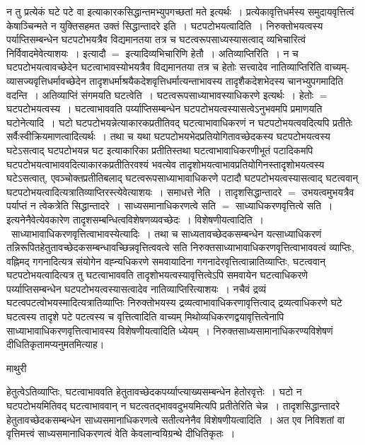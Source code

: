 \documentclass[10pt, openany]{book}
\begin{document}
{न तु प्रत्येकं घटे पटे वा इत्याकारकसिद्धान्तमभ्युपगच्छतां मते इत्यर्थः~। प्रत्येकावृत्तिधर्मस्य समुदायवृत्तित्वं केषाञ्चिन्मते न युक्तिसहमत उक्तं सिद्धान्तादरे
इति~। घटपटोभयत्वादिति~। निरुक्तोभयत्वस्य पर्याप्तिसम्बन्धेन घटपटोभयत्रैव विद्यमानतया तत्र च घटत्वरूपसाध्यस्यासत्वाद् व्यभिचारित्वं निर्विवादमेवेत्याशयः~। इत्यादौ $=$ इत्यादिव्यभिचारिणि हेतौ~। {\qt अतिव्याप्तिरिति~}। न च घटपटोभयत्वावच्छेदेन घटत्वाभावस्योभयत्रैव विद्यमानतया तत्र च हेतोः सत्त्वादेव नातिव्याप्तिरिति वाच्यम्-व्यासज्यवृत्तिधर्मावच्छेदेन तादृशधर्माश्रयैकदेशवृत्तिधर्मात्यन्ताभावस्य तादृशैकदेशभेदस्य चानभ्युपगमादिति वदन्ति~। अतिव्याप्तिं संगमयति घटत्वेति~। घटत्वरूपसाध्याभावस्याधिकरणे इत्यर्थः~। हेतोः $=$ घटपटोभयत्वस्य~। घटत्वाभाववति पर्य्याप्तिसम्बन्धेन घटपटोभयत्वस्यासत्वेऽनुभवमपि प्रमाणयति घटोनेत्यादि~। घटो घटपटोभयन्नेत्याकारकप्रतीतिवद् घटत्वाभावाधिकरणं न घटपटोभयत्ववदित्यपि प्रतीतेः सर्वैःस्वीक्रियमाणत्वादित्यर्थः~। तथा च यथा घटपटोभयभेदप्रतियोगितावच्छेदकस्य घटपटोभयत्वस्य घटेऽसत्वाद् घटपटोभयन्न घट इत्याकारिका प्रतीतिस्तथा घटत्वाभावाधिकरणीभूतं पटादिकमपि घटपटोभयत्वाभाववदित्याकारकप्रतीतिरवश्यं भवत्येव तादृशोभयत्वाभावप्रतियोगिनस्तादृशोभयत्वस्य घटेऽसत्वात्, एवञ्चोक्तप्रतीतिबलाद् घटत्वरूपसाध्याभावाधिकरणे पटादौ घटपटोभयत्वस्यासत्वाद् घटत्ववान् घटपटोभयत्वादित्यत्रातिव्याप्तिरस्त्येवेत्याशयः~। समाधत्ते {\qt नेति~}। तादृशसिद्धान्तादरे $=$ उभयत्वमुभयत्रैव पर्याप्तं न त्वेकत्रेति सिद्धान्तादरे~। साध्यसमानाधिकरणत्वे सति
 $=$ साध्याधिकरणवृत्तित्वे सति~। इत्यनेनैवेत्येवकारेण तादृशसम्बन्धित्वविशेषणव्यवच्छेदः~। {\qt विशेषणीयत्वादिति~}।~साध्याभावाधिकरणवृत्तित्वाभावस्येत्यादिः~। तथा च
साध्यतावच्छेदकसम्बन्धेन यत्साध्याधिकरणं तन्निरूपितहेतुतावच्छेदकसम्बन्धावच्छिन्नवृत्तित्ववत्वे सति निरुक्तसाध्याभावाधिकरणवृत्तित्वाभाववत्वं व्याप्तिः, वह्निमद् गगनादित्यत्र संयोगेन वह्न्यधिकरणे समवायादिना गगनादेरवृत्तित्वान्नातिव्याप्तिः, घटत्ववान् घटपटोभयत्वादित्यत्र तु घटत्वाभाववति तादृशोभयत्वस्यावृत्तित्वेऽपि समवायेन घटत्वाधिकरणे पर्य्याप्तिसम्बन्धेन घटपटोभयत्वस्यासत्वादेव नातिव्याप्तिरित्याशयः~। नचैवं द्रव्यं घटत्वपटत्वोभयस्मादित्यत्रातिव्याप्तिः निरुक्तोभयस्य द्रव्यत्वाभावाधिकरणावृत्तित्वाद् द्रव्यत्वाधिकरणे घटे घटत्वस्य तादृशे पटे पटत्वस्य च वृत्तित्वादिति वाच्यम् मिथोव्यधिकरणद्वयावृत्तित्वेनापि साध्याभावाधिकरणवृत्तित्वाभावस्य विशेषणीयत्वादिति ध्येयम्~। निरुक्तसाध्यसामानाधिकरण्यविशेषणं दीधितिकृतामप्यनुमतमित्याह।
\newpage
\begin{center}  माथुरी  \end{center}
{\la हेतुत्वेऽतिव्याप्तिः, घटत्वाभाववति हेतुतावच्छेदकपर्य्याप्त्याख्यसम्बन्धेन हेतोरवृत्तेः~। घटो न घटपटोभयमितिवद् घटत्वाभाववान् न घटत्वतद्भाववदुभयमित्यपि प्रतीतेरिति चेन्न~। तादृशसिद्धान्तादरे हेतुतावच्छेदकसम्बन्धेन साध्यसमानाधिकरणत्वे सतीत्यनेनैव विशेषणीयत्वादिति~। अत एव निविशतां वा वृत्तिमत्त्वं साध्यसमानाधिकरणत्वं वेति केवलान्वयिग्रन्थे {\vp दीधितिकृतः}~।}

}
\end{document}
